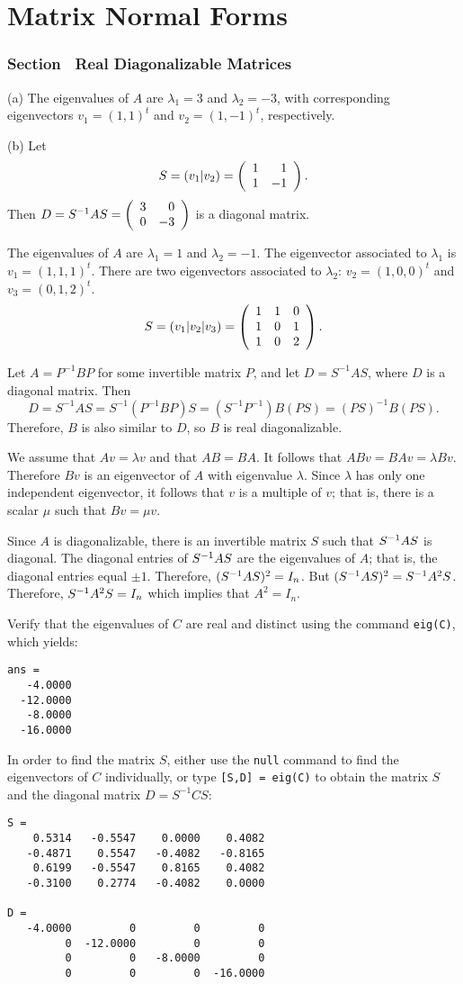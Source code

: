 \chapter{Matrix Normal Forms}

\subsection*{Section~\protect{\ref{S:RDM}} Real Diagonalizable Matrices}

(a) The eigenvalues of $A$ are $\lambda_1 = 3$ and $\lambda_2 = -3$,
with corresponding eigenvectors $v_1 = (1,1)^t$ and $v_2 = (1,-1)^t$,
respectively.

(b) Let
\[
S = (v_1|v_2) = \left(\begin{array}{rr} 1 & 1\\ 1 &-1\end{array}\right).
\]
Then $D = S^{-1}AS = \left(\begin{array}{rr} 3 & 0\\ 0 &-3\end{array}\right)$ is a diagonal matrix.

The eigenvalues of $A$ are $\lambda_1 = 1$ and $\lambda_2 = -1$.  The
eigenvector associated to $\lambda_1$ is $v_1 = (1,1,1)^t$.  There are
two eigenvectors associated to $\lambda_2$: $v_2 = (1,0,0)^t$ and
$v_3 = (0,1,2)^t$.
\[
S = (v_1|v_2|v_3) = \left(\begin{array}{rrr} 1 & 1 & 0 \\ 1 & 0 & 1 \\ 1 & 0 & 2\end{array}\right).
\]

Let $A = P^{-1}BP$ for some invertible matrix $P$, and let
$D = S^{-1}AS$, where $D$ is a diagonal matrix.  Then
\[
D = S^{-1}AS = S^{-1}(P^{-1}BP)S = (S^{-1}P^{-1})B(PS) = 
(PS)^{-1}B(PS).
\]
Therefore, $B$ is also similar to $D$, so $B$ is real diagonalizable.

  We assume that $Av=\lambda v$ and that $AB=BA$.  It follows that 
$ABv=BAv=\lambda Bv$.  Therefore $Bv$ is an eigenvector of $A$ with eigenvalue
$\lambda$.  Since $\lambda$ has only one independent eigenvector, it follows that 
$v$ is a multiple of $v$; that is, there is a scalar $\mu$ such that $Bv=\mu v$.

\newpage
{} Since $A$ is diagonalizable, there is an invertible matrix $S$ such 
that $S^{-1} AS$ is diagonal.  The diagonal entries of  $S^{-1} AS$ are the eigenvalues
of $A$; that is, the diagonal entries equal $\pm 1$.  Therefore, $(S^{-1} AS)^2=I_n$.
But $(S^{-1} AS)^2 = S^{-1} A^2 S$.   Therefore, $S^{-1} A^2 S=I_n$ which implies that
$A^2=I_n$.

Verify that the eigenvalues of $C$ are real and distinct using the
\Matlab command {\tt eig(C)}, which yields:
\begin{verbatim}
ans =
   -4.0000
  -12.0000
   -8.0000
  -16.0000
\end{verbatim}
In order to find the matrix $S$, either use the {\tt null} command to
find the eigenvectors of $C$ individually, or type
{\tt [S,D] = eig(C)} to obtain the matrix $S$ and the diagonal matrix
$D = S^{-1}CS$:
\begin{verbatim}
S =
    0.5314   -0.5547    0.0000    0.4082
   -0.4871    0.5547   -0.4082   -0.8165
    0.6199   -0.5547    0.8165    0.4082
   -0.3100    0.2774   -0.4082    0.0000

D =
   -4.0000         0         0         0
         0  -12.0000         0         0
         0         0   -8.0000         0
         0         0         0  -16.0000
\end{verbatim}

